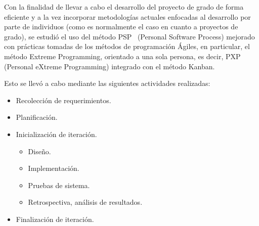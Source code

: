 Con la finalidad de llevar a cabo el desarrollo del proyecto de grado de forma eficiente y a la vez incorporar metodologías actuales enfocadas al desarrollo por parte de individuos (como es normalmente el caso en cuanto a proyectos de grado), se estudió el uso del método PSP~\citep{Humphrey200503} (Personal Software Process) mejorado con prácticas tomadas de los métodos de programación Ágiles, en particular, el método Extreme Programming, orientado a una sola persona, es decir, PXP~\citep{pxppaper} (Personal eXtreme Programming) integrado con el método Kanban.

Esto se llevó a cabo mediante las siguientes actividades realizadas:

\begin{itemize}
	\itemsep1pt \parskip1pt 
	\item Recolección de requerimientos.
	\item Planificación.
	\item Inicialización de iteración.
	\begin{itemize}
		\item Diseño.
		\item Implementación.
		\item Pruebas de sistema.
		\item Retrospectiva, análisis de resultados.
	\end{itemize}
	\item Finalización de iteración.
\end{itemize}